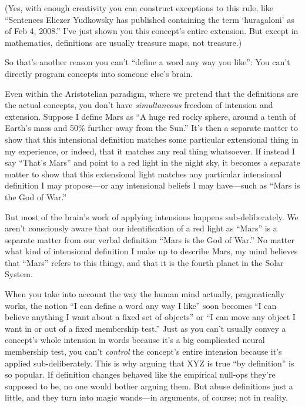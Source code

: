 {
 (Yes, with enough creativity you can construct exceptions to this
rule, like ``Sentences Eliezer Yudkowsky has published
containing the term `huragaloni' as of
Feb 4, 2008.'' I've just shown you
this concept's entire extension. But except in
mathematics, definitions are usually treasure maps, not treasure.)}

{
 So that's another reason you can't
``define a word any way you like'':
You can't directly program concepts into someone
else's brain.}

{
 Even within the Aristotelian paradigm, where we pretend that the
definitions are the actual concepts, you don't have
\textit{simultaneous} freedom of intension and extension. Suppose I
define Mars as ``A huge red rocky sphere, around a
tenth of Earth's mass and 50\% further away from the
Sun.'' It's then a separate matter to
show that this intensional definition matches some particular
extensional thing in my experience, or indeed, that it matches any real
thing whatsoever. If instead I say
``That's Mars'' and
point to a red light in the night sky, it becomes a separate matter to
show that this extensional light matches any particular intensional
definition I may propose---or any intensional beliefs I may have---such
as ``Mars is the God of War.''}

{
 But most of the brain's work of applying
intensions happens sub-deliberately. We aren't
consciously aware that our identification of a red light as
``Mars'' is a separate matter from
our verbal definition ``Mars is the God of
War.'' No matter what kind of intensional definition
I make up to describe Mars, my mind believes that
``Mars'' refers to this thingy, and
that it is the fourth planet in the Solar System.}

{
 When you take into account the way the human mind actually,
pragmatically works, the notion ``I can define a word
any way I like'' soon becomes ``I
can believe anything I want about a fixed set of
objects'' or ``I can move any object
I want in or out of a fixed membership test.'' Just
as you can't usually convey a concept's
whole intension in words because it's a big complicated
neural membership test, you can't \textit{control} the
concept's entire intension because it's
applied sub-deliberately. This is why arguing that XYZ is true
``by definition'' is so popular. If
definition changes behaved like the empirical null-ops
they're supposed to be, no one would bother arguing
them. But abuse definitions just a little, and they turn into magic
wands---in arguments, of course; not in reality.}

